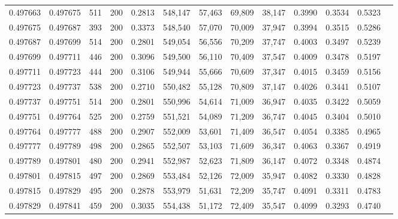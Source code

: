 \begin{tabular}{rrrrrrrrrrrrr}
0.497663 & 0.497675 &    511 & 200 &                                     0.2813 & 548,147 &  57,463 &  69,809 &  38,147 & 0.3990 & 0.3534 & 0.5323 \\
0.497675 & 0.497687 &    393 & 200 &                                     0.3373 & 548,540 &  57,070 &  70,009 &  37,947 & 0.3994 & 0.3515 & 0.5286 \\
0.497687 & 0.497699 &    514 & 200 &                                     0.2801 & 549,054 &  56,556 &  70,209 &  37,747 & 0.4003 & 0.3497 & 0.5239 \\
0.497699 & 0.497711 &    446 & 200 &                                     0.3096 & 549,500 &  56,110 &  70,409 &  37,547 & 0.4009 & 0.3478 & 0.5197 \\
0.497711 & 0.497723 &    444 & 200 &                                     0.3106 & 549,944 &  55,666 &  70,609 &  37,347 & 0.4015 & 0.3459 & 0.5156 \\
0.497723 & 0.497737 &    538 & 200 &                                     0.2710 & 550,482 &  55,128 &  70,809 &  37,147 & 0.4026 & 0.3441 & 0.5107 \\
0.497737 & 0.497751 &    514 & 200 &                                     0.2801 & 550,996 &  54,614 &  71,009 &  36,947 & 0.4035 & 0.3422 & 0.5059 \\
0.497751 & 0.497764 &    525 & 200 &                                     0.2759 & 551,521 &  54,089 &  71,209 &  36,747 & 0.4045 & 0.3404 & 0.5010 \\
0.497764 & 0.497777 &    488 & 200 &                                     0.2907 & 552,009 &  53,601 &  71,409 &  36,547 & 0.4054 & 0.3385 & 0.4965 \\
0.497777 & 0.497789 &    498 & 200 &                                     0.2865 & 552,507 &  53,103 &  71,609 &  36,347 & 0.4063 & 0.3367 & 0.4919 \\
0.497789 & 0.497801 &    480 & 200 &                                     0.2941 & 552,987 &  52,623 &  71,809 &  36,147 & 0.4072 & 0.3348 & 0.4874 \\
0.497801 & 0.497815 &    497 & 200 &                                     0.2869 & 553,484 &  52,126 &  72,009 &  35,947 & 0.4082 & 0.3330 & 0.4828 \\
0.497815 & 0.497829 &    495 & 200 &                                     0.2878 & 553,979 &  51,631 &  72,209 &  35,747 & 0.4091 & 0.3311 & 0.4783 \\
0.497829 & 0.497841 &    459 & 200 &                                     0.3035 & 554,438 &  51,172 &  72,409 &  35,547 & 0.4099 & 0.3293 & 0.4740 \\

\end{tabular}
